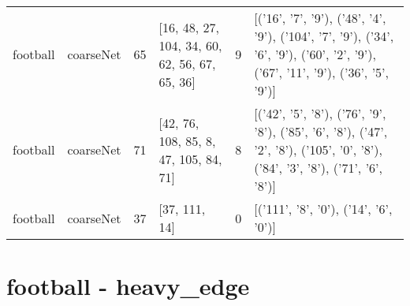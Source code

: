 \begin{tabular}{llllll}
football & coarseNet & 65 & [16, 48, 27, 104, 34, 60, 62, 56, 67, 65, 36] & 9 & [('16', '7', '9'), ('48', '4', '9'), ('104', '7', '9'), ('34', '6', '9'), ('60', '2', '9'), ('67', '11', '9'), ('36', '5', '9')] \\
football & coarseNet & 71 & [42, 76, 108, 85, 8, 47, 105, 84, 71] & 8 & [('42', '5', '8'), ('76', '9', '8'), ('85', '6', '8'), ('47', '2', '8'), ('105', '0', '8'), ('84', '3', '8'), ('71', '6', '8')] \\
football & coarseNet & 37 & [37, 111, 14] & 0 & [('111', '8', '0'), ('14', '6', '0')] \\
\bottomrule
\end{tabular}


\section*{football - heavy_edge}
